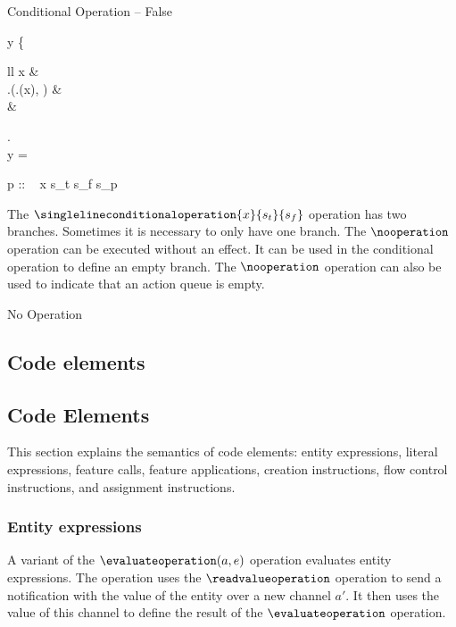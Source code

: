 \singlelineinferencerule
	{Conditional Operation -- False}
	{
		y \mathematicaldefinition 
			\left\{
				\begin{array}{ll}
					x &  \\
					\state.\attributevaluefeature(\state.(x), \booleanclasstypeitemattributename) &  \\
					\truevalue & \otherwisecondition
				\end{array}
			\right. \\
		y = \falsevalue
	}
	{
		\configuration
			{
				p :: \ \singlelineconditionaloperation
					{x}
					{s_{t}}
					{s_{f}} \statementseparator
				s_{p}
			}
			{\state}
	}
	{}
 
The $\singlelineconditionaloperation{x}{s_{t}}{s_{f}}$ operation has two branches. Sometimes it is necessary to only have one branch. The $\nooperation$ operation can be executed without an effect. It can be used in the conditional operation to define an empty branch. The $\nooperation$ operation can also be used to indicate that an action queue is empty.

\singlelineinferencerule
	{No Operation}
	{}
	{}
	{}
 
\begin{fortechnicalreport}
\subsection{Code elements}
\end{fortechnicalreport}
\begin{forjournal}
\subsection{Code Elements}
\end{forjournal}
This section explains the semantics of code elements: entity expressions, literal expressions, feature calls, feature applications, creation instructions, flow control instructions, and assignment instructions.

\subsubsection{Entity expressions}
A variant of the $\evaluateoperation(a, e)$ operation evaluates entity expressions. The operation uses the $\readvalueoperation$ operation to send a notification with the value of the entity over a new channel $a'$. It then uses the value of this channel to define the result of the $\evaluateoperation$ operation.

